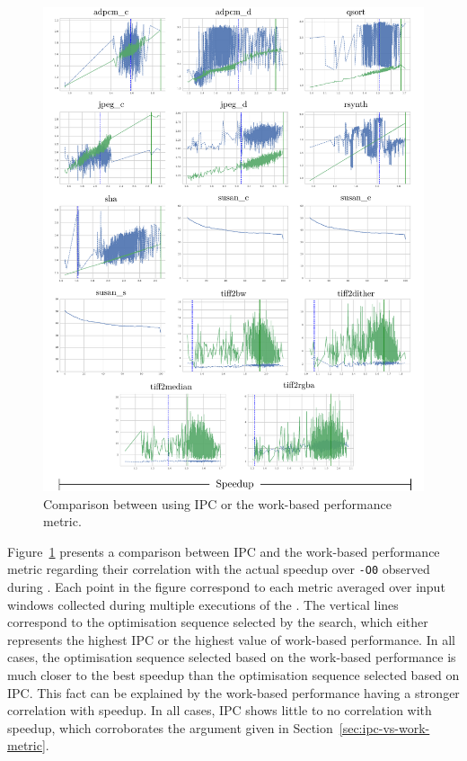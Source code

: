 \begin{figure}[h!]
    \centering
    \includegraphics[width=\textwidth]{figs/ipc-vs-work.pdf}
    \caption{Comparison between {\itercomp} using IPC or the work-based performance metric.}
    \label{fig:ipc-vs-work}
\end{figure}


Figure~\ref{fig:ipc-vs-work} presents a comparison between IPC and the work-based performance metric regarding their correlation with the actual speedup over \verb|-O0| observed during {\itercomp}.
Each point in the figure correspond to each metric averaged over input windows collected during multiple executions of the {\itercomp}.
The vertical lines correspond to the optimisation sequence selected by the {\itercomp} search, which either represents the highest IPC or the highest value of work-based performance.
In all cases, the optimisation sequence selected based on the work-based performance is much closer to the best speedup than the optimisation sequence selected based on IPC.
This fact can be explained by the work-based performance having a stronger correlation with speedup.
In all cases, IPC shows little to no correlation with speedup, which corroborates the argument given in Section~\ref{sec:ipc-vs-work-metric}.

